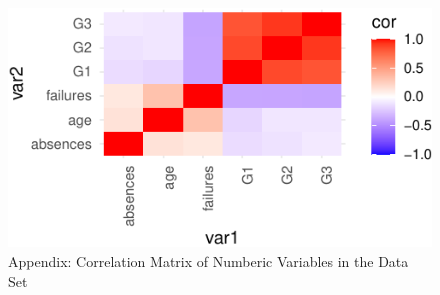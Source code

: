 \documentclass[a4paper,8pt,twocolumn,twoside,]{pinp}
\begin{document}
\begin{figure}

{\centering \includegraphics{CC05E4-FinalReport_files/figure-latex/corr-1} 

}

\caption{Appendix: Correlation Matrix of Numberic Variables in the Data Set}\label{fig:corr}
\end{figure}


\pnasbreak 



\end{document}
